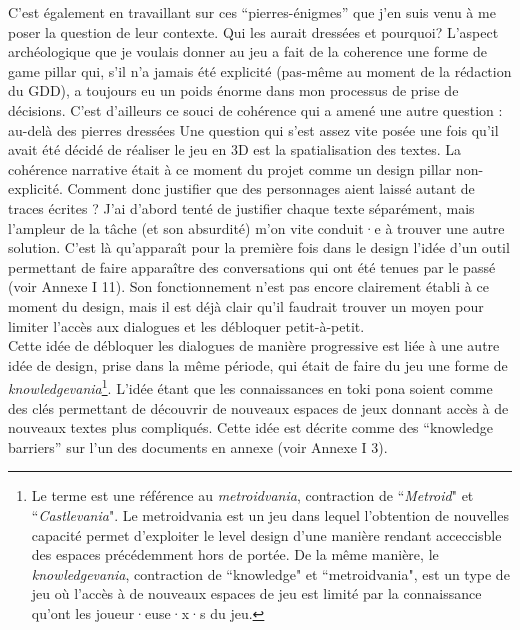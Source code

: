 \documentclass{scrartcl}
\begin{document}
	C'est également en travaillant sur ces “pierres-énigmes” que j'en suis venu à me poser la question de leur contexte. Qui les aurait dressées et pourquoi? L'aspect archéologique que je voulais donner au jeu a fait de la coherence une forme de game pillar qui, s'il n'a jamais été explicité (pas-même au moment de la rédaction du GDD), a toujours eu un poids énorme dans mon processus de prise de décisions. C'est d'ailleurs ce souci de cohérence qui a amené une autre question : au-delà des pierres dressées
	Une question qui s'est assez vite posée une fois qu'il avait été décidé de réaliser le jeu en 3D est la spatialisation des textes. La cohérence narrative était à ce moment du projet comme un design pillar non-explicité. Comment donc justifier que des personnages aient laissé autant de traces écrites ? J'ai d'abord tenté de justifier chaque texte séparément, mais l'ampleur de la tâche (et son absurdité) m'on vite conduit·e à trouver une autre solution. C'est là qu'apparaît pour la première fois dans le design l'idée d'un outil permettant de faire apparaître des conversations qui ont été tenues par le passé (voir Annexe I 11). Son fonctionnement n'est pas encore clairement établi à ce moment du design, mais il est déjà clair qu'il faudrait trouver un moyen pour limiter l'accès aux dialogues et les débloquer petit-à-petit.\\
	Cette idée de débloquer les dialogues de manière progressive est liée à une autre idée de design, prise dans la même période, qui était de faire du jeu une forme de \textit{knowledgevania}\footnote{Le terme est une référence au \textit{metroidvania}, contraction de “\textit{Metroid}" et “\textit{Castlevania}". Le metroidvania est un jeu dans lequel l'obtention de nouvelles capacité permet d'exploiter le level design d'une manière rendant acceccisble des espaces précédemment hors de portée. De la même manière, le \textit{knowledgevania}, contraction de “knowledge" et “metroidvania", est un type de jeu où l'accès à de nouveaux espaces de jeu est limité par la connaissance qu'ont les joueur·euse·x·s du jeu.}. L'idée étant que les connaissances en toki pona soient comme des clés permettant de découvrir de nouveaux espaces de jeux donnant accès à de nouveaux textes plus compliqués. Cette idée est décrite comme des “knowledge barriers” sur l'un des documents en annexe (voir Annexe I 3).\\
\end{document}
